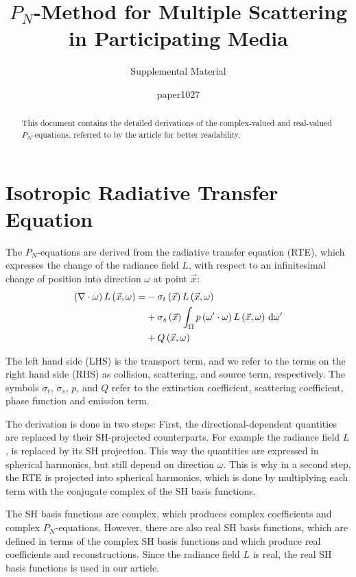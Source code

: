 \documentclass[10pt]{scrartcl}
\title{$P_N$-Method for Multiple Scattering in Participating Media}
\subtitle{Supplemental Material}
\author{paper1027}
\date{}
\begin{document}
%
\maketitle
\begin{abstract}
This document contains the detailed derivations of the complex-valued and real-valued $P_N$-equations, referred to by the article for better readability.
\end{abstract}

\tableofcontents

\newpage


\section{Isotropic Radiative Transfer Equation}

The $P_N$-equations are derived from the radiative transfer equation (RTE), which expresses the change of the radiance field $L$, with respect to an infinitesimal change of position into direction $\omega$ at point $\vec{x}$:
\begin{align}
\left(\nabla\cdot\omega\right)L\left(\vec{x}, \omega \right)
=&
-\sigma_t\left(\vec{x}\right) L\left(\vec{x}, \omega \right)\nonumber\\
&
+\sigma_s\left(\vec{x}\right) \int_{\Omega}
{
p\left(\omega'\cdot\omega\right)L\left(\vec{x}, \omega \right)\,\mathrm{d}\omega'
}\nonumber\\
&
+Q\left(\vec{x}, \omega\right)\nonumber
\end{align}

The left hand side (LHS) is the transport term, and we refer to the terms on the right hand side (RHS) as collision, scattering, and source term, respectively. The symbols $\sigma_t$, $\sigma_s$, $p$, and $Q$ refer to the extinction coefficient, scattering coefficient, phase function and emission term.

The derivation is done in two steps: First, the directional-dependent quantities are replaced by their SH-projected counterparts. For example the radiance field $L$, is replaced by its SH projection. This way the quantities are expressed in spherical harmonics, but still depend on direction $\omega$. This is why in a second step, the RTE is projected into spherical harmonics, which is done by multiplying each term with the conjugate complex of the SH basis functions.

The SH basis functions are complex, which produces complex coefficients and complex $P_N$-equations. However, there are also real SH basis functions, which are defined in terms of the complex SH basis functions and which produce real coefficients and reconstructions. Since the radiance field $L$ is real, the real SH basis functions is used in our article.
\end{document}
